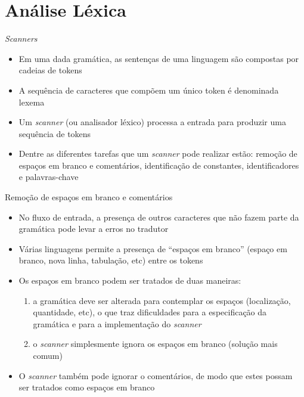 \section{Análise Léxica}

\begin{frame}[fragile]{{\it Scanners}}

    \begin{itemize}
        \item Em uma dada gramática, as sentenças de uma linguagem são compostas por cadeias de tokens
        \pause

        \item A sequência de caracteres que compõem um único token é denominada lexema
        \pause

        \item Um \textit{scanner} (ou analisador léxico) processa a entrada para produzir uma sequência de tokens
        \pause

        \item Dentre as diferentes tarefas que um \textit{scanner} pode realizar estão: remoção de espaços em branco e comentários, identificação de
            constantes, identificadores e palavras-chave
    \end{itemize}

\end{frame}

\begin{frame}[fragile]{Remoção de espaços em branco e comentários}

    \begin{itemize}
        \item No fluxo de entrada, a presença de outros caracteres que não fazem parte da gramática pode levar a erros no tradutor
        \pause

        \item Várias linguagens permite a presença de ``espaços em branco'' (espaço em branco, nova linha, tabulação, etc) entre os tokens
        \pause

        \item Os espaços em branco podem ser tratados de duas maneiras:
        \pause
        \begin{enumerate}
            \item a gramática deve ser alterada para contemplar os espaços (localização, quantidade, etc), o que traz dificuldades para a especificação da gramática
            e para a implementação do \textit{scanner}
            \pause

            \item o \textit{scanner} simplesmente ignora os espaços em branco (solução mais comum)
        \end{enumerate}
        \pause

        \item O \textit{scanner} também pode ignorar o comentários, de modo que estes possam ser tratados como espaços em branco
    \end{itemize}

\end{frame}

